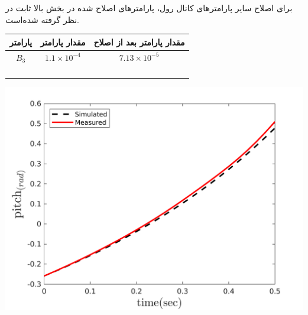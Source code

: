 

برای اصلاح سایر پارامترهای کانال رول، پارامترهای اصلاح شده در بخش بالا ثابت در نظر گرفته شده‌است.



\begin{minipage}[H]{\linewidth}
	\hfill
	\begin{minipage}[b]{0.49\linewidth}
		\centering
		\begin{tabular}{ccc}\hline
			پارامتر & مقدار پارامتر  & مقدار پارامتر بعد از اصلاح
			\\ \hline
			$B_3$  & $1.1\times10^{-4}$ & $7.13\times10^{-5}$ \\ \hline
			\\
			\\\\\\
		\end{tabular}
	\end{minipage}
	\begin{minipage}[b]{0.48\linewidth}
		\centering
		\includegraphics[width=1\linewidth]{../Figures/RCP/pitch_parameter_estimation/RCP_pitch_S1.png}
	\end{minipage}
\end{minipage}



